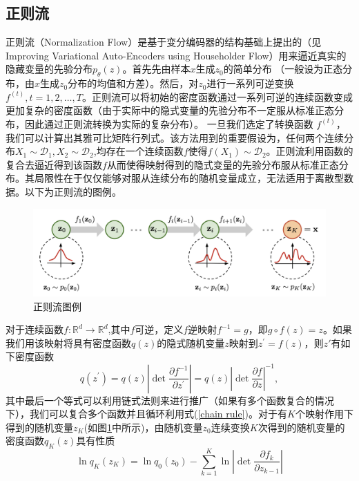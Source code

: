 \subsection{正则流}
正则流（Normalization Flow）是基于变分编码器的结构基础上提出的（见Improving Variational Auto-Encoders
using Householder Flow）用来逼近真实的隐藏变量的先验分布$p_{\theta}(z)$。首先先由样本$x$生成$z_0$的简单分布
（一般设为正态分布，由$x$生成$z_0$分布的均值和方差）。然后，对$z_0$进行一系列可逆变换$f^{(t)},t=1,2,\dots,T$。正则流可以将初始的密度函数通过一系列可逆的连续函数变成更加复杂的密度函数（由于实际中的隐式变量的先验分布不一定服从标准正态分布，因此通过正则流转换为实际的复杂分布）。 一旦我们选定了转换函数
$f^{(t)}$， 我们可以计算出其雅可比矩阵行列式。该方法用到的重要假设为，任何两个连续分布$X_1\sim \mathcal{D}_1,X_2\sim \mathcal{D}_2$,均存在一个连续函数$f$使得$f(X_1)\sim \mathcal{D_2}$。正则流利用函数的复合去逼近得到该函数$f$从而使得映射得到的隐式变量的先验分布服从标准正态分布。其局限性在于仅仅能够对服从连续分布的随机变量成立，无法适用于离散型数据。以下为正则流的图例。
\begin{figure}[H]
    \centering
    \includegraphics[scale=0.15]{Picture/norm_flow.png}
    \caption{正则流图例}
    \label{Norm_flow}
\end{figure}
对于连续函数$f:\mathbb{R}^{d}\rightarrow \mathbb{R}^d$,其中$f$可逆，定义$f$逆映射$f^{-1}=g$，即$g\circ f(z)=z$。如果我们用该映射将具有密度函数$q(z)$的隐式随机变量$z$映射到$z^{\prime}=f(z)$，则$z'$有如下密度函数
\begin{equation}
    q(z^{\prime}) = q(z)|\operatorname{det}\frac{\partial f^{-1}}{\partial z^{\prime}}|= q(z)|\operatorname{det}\frac{\partial f}{\partial z}|^{-1},
    \label{chain rule}
\end{equation}
其中最后一个等式可以利用链式法则来进行推广（如果有多个函数复合的情况下），我们可以复合多个函数并且循环利用式(\ref{chain rule})。对于有$K$个映射作用下得到的随机变量$z_{K}$(如图\ref{Norm_flow}中所示)，由随机变量$z_0$连续变换$K$次得到的随机变量的密度函数$q_{K}(z)$具有性质
\begin{equation}
    \ln q_{K}(z_{K}) = \ln q_{0}(z_0)-\sum_{k=1}^{K}\ln |\operatorname{det}\frac{\partial f_k}{\partial z_{k-1}}|
    \label{chain log likelihood}
\end{equation}
